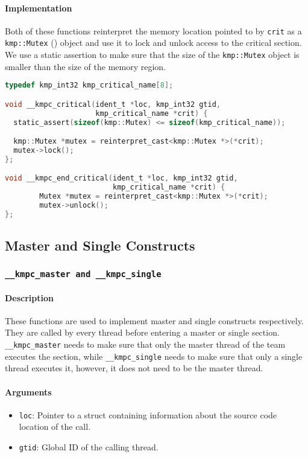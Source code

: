 \paragraph{Implementation} Both of these functions reinterpret the memory location pointed to by
\texttt{crit} as a \texttt{kmp::Mutex} () object and use it to lock and unlock access to
the critical section. We use a static assertion to make sure that the size of the
\texttt{kmp::Mutex} object is smaller than the size of the memory region.

\begin{lstlisting}[language=C, caption={__kmpc_critical and __kmpc_end_critical},
                   label={lst:kmpc-critical}, escapechar=@]
typedef kmp_int32 kmp_critical_name[8];

void __kmpc_critical(ident_t *loc, kmp_int32 gtid,
                     kmp_critical_name *crit) {
  static_assert(sizeof(kmp::Mutex) <= sizeof(kmp_critical_name));

  kmp::Mutex *mutex = reinterpret_cast<kmp::Mutex *>(*crit);
  mutex->lock();
};

void __kmpc_end_critical(ident_t *loc, kmp_int32 gtid,
                         kmp_critical_name *crit) {
		Mutex *mutex = reinterpret_cast<kmp::Mutex *>(*crit);
		mutex->unlock();
};
\end{lstlisting}

\subsection{Master and Single Constructs}

\subsubsection{\texttt{__kmpc_master and __kmpc_single}}

\paragraph{Description} These functions are used to implement master and single constructs
respectively. They are called by every thread before entering a master or single section.
\texttt{\_\_kmpc\_master} needs to make sure that only the master thread of the team executes the
section, while \texttt{\_\_kmpc\_single} needs to make sure that only a single thread executes it,
however, it does not need to be the master thread.

\paragraph{Arguments}
\begin{itemize}
	\item \texttt{loc}: Pointer to a struct containing information about the source code location
	      of the call.
	\item \texttt{gtid}: Global ID of the calling thread.
\end{itemize}

